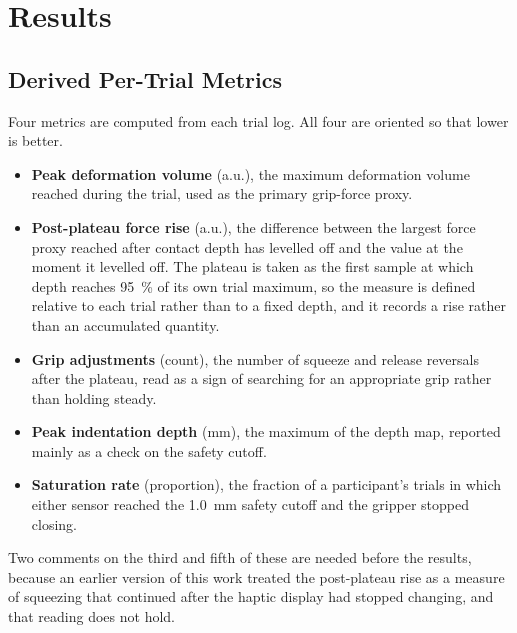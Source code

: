 \documentclass[12pt, a4paper, twoside, openright]{report}
\begin{document}
\chapter{Results}
\label{ch:results}

\section{Derived Per-Trial Metrics}
\label{sec:metrics}

Four metrics are computed from each trial log. All four are oriented so that
lower is better.

\begin{itemize}
    \item \textbf{Peak deformation volume} (a.u.), the maximum deformation
          volume reached during the trial, used as the primary grip-force
          proxy.
    \item \textbf{Post-plateau force rise} (a.u.), the difference between the
          largest force proxy reached after contact depth has levelled off and
          the value at the moment it levelled off. The plateau is taken as the
          first sample at which depth reaches \SI{95}{\percent} of its own
          trial maximum, so the measure is defined relative to each trial
          rather than to a fixed depth, and it records a rise rather than an
          accumulated quantity.
    \item \textbf{Grip adjustments} (count), the number of squeeze and release
          reversals after the plateau, read as a sign of searching for an
          appropriate grip rather than holding steady.
    \item \textbf{Peak indentation depth} (\si{\milli\metre}), the maximum of
          the depth map, reported mainly as a check on the safety cutoff.
    \item \textbf{Saturation rate} (proportion), the fraction of a
          participant's trials in which either sensor reached the
          \SI{1.0}{\milli\metre} safety cutoff and the gripper stopped closing.
\end{itemize}

Two comments on the third and fifth of these are needed before the results,
because an earlier version of this work treated the post-plateau rise as a
measure of squeezing that continued after the haptic display had stopped
changing, and that reading does not hold.
\end{document}
